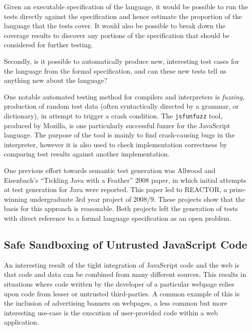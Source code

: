 \documentclass[a4paper]{article}
\begin{document}
Given an executable specification of the language, it would be possible to run
the tests directly against the specification and hence estimate the proportion
of the language that the tests cover. It would also be possible to break down
the coverage results to discover any portions of the specification
that should be considered for further testing.

Secondly, is it possible to automatically produce new, interesting test cases
for the language from the formal specification, and can these new tests tell us
anything new about the language? %

One notable automated testing method for compilers and interpreters is
\emph{fuzzing}, production of random test data (often syntactically directed by
a grammar, or dictionary), in attempt to trigger a crash condition. The
\texttt{jsfunfuzz} tool, produced by Mozilla, is one particularly successful
fuzzer for the JavaScript language. The purpose of the tool is mainly to find
crash-causing bugs in the interpreter, however it is also used to check
implementation correctness by comparing test results against another implementation.

One previous effort towards semantic test generation was Allwood and Eisenbach's
``Tickling Java with a Feather'' 2008 paper, in which initial attempts at test
generation for Java were reported. This paper led to REACTOR, a prize-winning
undergraduate 3rd year project of 2008/9. These projects show that the basis for
this approach is reasonable. Both projects left the generation of tests with direct
reference to a formal language specification as an open problem.

\subsection{Safe Sandboxing of Untrusted JavaScript Code}
An interesting result of the tight integration of JavaScript code and the web is
that code and data can be combined from many different sources. This results in
situations where code written by the developer of a particular webpage relies
upon code from lesser or untrusted third-parties. A common example of this is
the inclusion of advertising banners on webpages, a less common but more
interesting use-case is the execution of user-provided code within a web
application.
\end{document}
